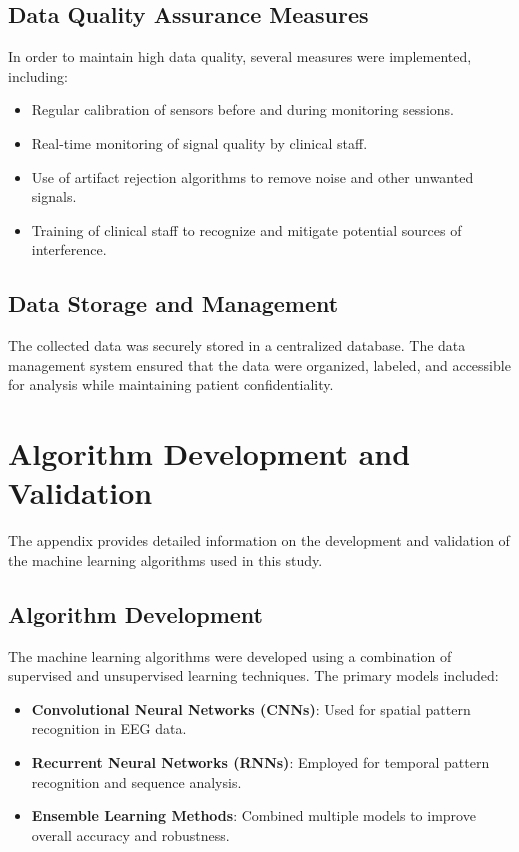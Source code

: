 \documentclass[12pt,journal,compsoc]{IEEEtran}
\begin{document}
\subsection{Data Quality Assurance Measures}
In order to maintain high data quality, several measures were implemented, including:
\begin{itemize}
    \item Regular calibration of sensors before and during monitoring sessions.
    \item Real-time monitoring of signal quality by clinical staff.
    \item Use of artifact rejection algorithms to remove noise and other unwanted signals.
    \item Training of clinical staff to recognize and mitigate potential sources of interference.
\end{itemize}

\subsection{Data Storage and Management}
The collected data was securely stored in a centralized database. The data management system ensured that the data were organized, labeled, and accessible for analysis while maintaining patient confidentiality.

\section{Algorithm Development and Validation}
The appendix provides detailed information on the development and validation of the machine learning algorithms used in this study.

\subsection{Algorithm Development}
The machine learning algorithms were developed using a combination of supervised and unsupervised learning techniques. The primary models included:
\begin{itemize}
    \item \textbf{Convolutional Neural Networks (CNNs)}: Used for spatial pattern recognition in EEG data.
    \item \textbf{Recurrent Neural Networks (RNNs)}: Employed for temporal pattern recognition and sequence analysis.
    \item \textbf{Ensemble Learning Methods}: Combined multiple models to improve overall accuracy and robustness.
\end{itemize}
\end{document}
